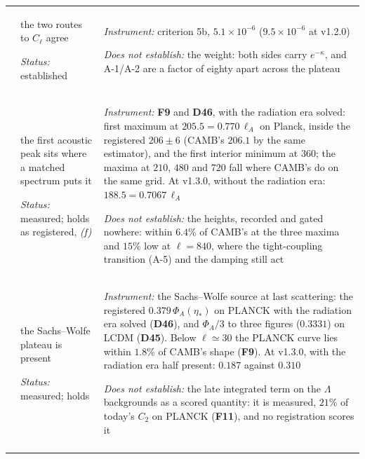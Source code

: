 \begin{longtable}{@{}>{\raggedright\arraybackslash}p{11mm}
                      >{\raggedright\arraybackslash}p{64mm}
                      >{\raggedright\arraybackslash}p{77mm}@{}}
\addlinespace[4pt]
7 & the two routes to $C_\ell$ agree\par\emph{Status:} established & \emph{Instrument:} criterion 5b, $5.1\times10^{-6}$ ($9.5\times10^{-6}$ at v1.2.0)\par\emph{Does not establish:} the weight: both sides carry $e^{-\kappa}$, and A-1/A-2 are a factor of eighty apart across the plateau \\
\addlinespace[4pt]
7 & the first acoustic peak sits where a matched spectrum puts it\par\emph{Status:} measured; holds as registered, \emph{(f)} & \emph{Instrument:} \textbf{F9} and \textbf{D46}, with the radiation era solved: first maximum at $205.5=0.770\,\ell_A$ on Planck, inside the registered $206\pm6$ (CAMB's $206.1$ by the same estimator), and the first interior minimum at $360$; the maxima at $210$, $480$ and $720$ fall where CAMB's do on the same grid. At v1.3.0, without the radiation era: $188.5=0.7067\,\ell_A$\par\emph{Does not establish:} the heights, recorded and gated nowhere: within $6.4\%$ of CAMB's at the three maxima and $15\%$ low at $\ell=840$, where the tight-coupling transition (A-5) and the damping still act \\
\addlinespace[4pt]
7 & the Sachs--Wolfe plateau is present\par\emph{Status:} measured; holds & \emph{Instrument:} the Sachs--Wolfe source at last scattering: the registered $0.379\,\Phi_A(\eta_*)$ on PLANCK with the radiation era solved (\textbf{D46}), and $\Phi_A/3$ to three figures ($0.3331$) on LCDM (\textbf{D45}). Below $\ell\simeq30$ the PLANCK curve lies within $1.8\%$ of CAMB's shape (\textbf{F9}). At v1.3.0, with the radiation era half present: $0.187$ against $0.310$\par\emph{Does not establish:} the late integrated term on the $\Lambda$ backgrounds as a scored quantity: it is measured, $21\%$ of today's $C_2$ on PLANCK (\textbf{F11}), and no registration scores it \\
\addlinespace[4pt]
\end{longtable}
\endgroup
